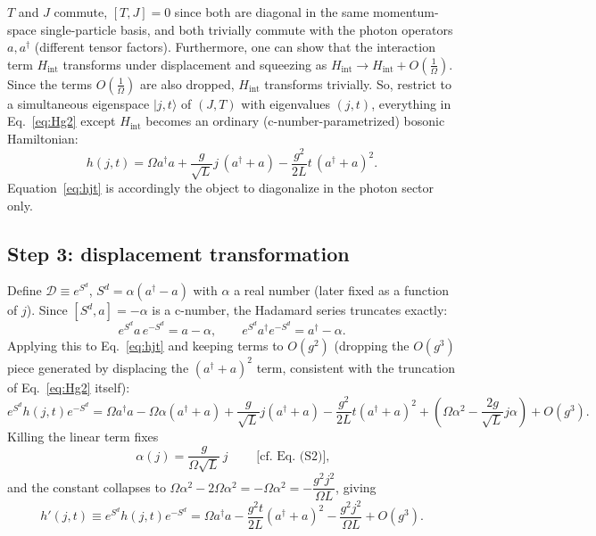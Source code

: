 \documentclass[../../main.tex]{subfiles}
\begin{document}
$T$ and $J$ commute, $[T,J]=0$ since both are diagonal in the same momentum-space
single-particle basis, and both trivially commute with the photon operators
$a,a^\dagger$ (different tensor factors). Furthermore, one can show that the interaction term 
$H_{\mathrm{int}}$ transforms under displacement and squeezing as 
$H_{\mathrm{int}} \rightarrow H_{\mathrm{int}} + O(\frac{1}{\Omega})$. 
Since the terms $O(\frac{1}{\Omega})$ are also dropped, $H_{\mathrm{int}}$ transforms trivially. 
So, restrict to a simultaneous
eigenspace $|j,t\rangle$ of $(J,T)$ with eigenvalues $(j,t)$, everything in
Eq.~\eqref{eq:Hg2} except $H_{\mathrm{int}}$ becomes an ordinary
(c-number-parametrized) bosonic Hamiltonian:
\begin{equation}
h(j,t)=\Omega a^\dagger a+\frac{g}{\sqrt L}j\,(a^\dagger+a)
-\frac{g^2}{2L}t\,(a^\dagger+a)^2. \label{eq:hjt}
\end{equation}
Equation~\eqref{eq:hjt} is accordingly the object to diagonalize in the photon
sector only.

\subsection*{Step 3: displacement transformation}
\label{sec:step3-displacement}

Define $\mathcal D\equiv e^{S^d}$, $S^{d}=\alpha(a^\dagger-a)$ with $\alpha$
a real number (later fixed as a function of $j$). Since $[S^d,a]=-\alpha$ is a
c-number, the Hadamard series truncates exactly:
\begin{equation}
e^{S^d}a\,e^{-S^d}=a-\alpha,\qquad e^{S^d}a^\dagger e^{-S^d}=a^\dagger-\alpha.
\end{equation}
Applying this to Eq.~\eqref{eq:hjt} and keeping terms to $O(g^2)$ (dropping the
$O(g^3)$ piece generated by displacing the $(a^\dagger+a)^2$ term, consistent
with the truncation of Eq.~\eqref{eq:Hg2} itself):
\begin{equation}
e^{S^d}h(j,t)e^{-S^d}=\Omega a^\dagger a
-\Omega\alpha(a^\dagger+a)+\frac{g}{\sqrt L}j(a^\dagger+a)
-\frac{g^2}{2L}t(a^\dagger+a)^2
+\left(\Omega\alpha^2-\frac{2g}{\sqrt L}j\alpha\right)+O(g^3).
\end{equation}
Killing the linear term fixes
\begin{equation}
\boxed{\;\alpha(j)=\frac{g}{\Omega\sqrt L}\,j\;}\qquad\text{[cf. Eq.~(S2)]},
\end{equation}
and the constant collapses to $\Omega\alpha^2-2\Omega\alpha^2=-\Omega\alpha^2
=-\dfrac{g^2j^2}{\Omega L}$, giving
\begin{equation}
h'(j,t)\equiv e^{S^d}h(j,t)e^{-S^d}
=\Omega a^\dagger a-\frac{g^2t}{2L}(a^\dagger+a)^2
-\frac{g^2j^2}{\Omega L}+O(g^3). \label{eq:hprime}
\end{equation}
\end{document}

